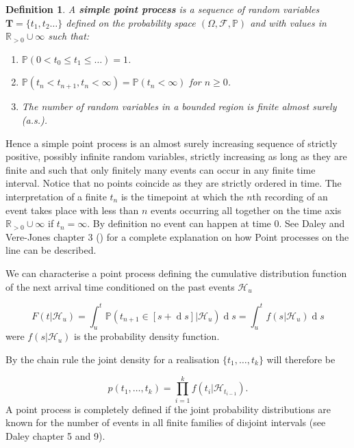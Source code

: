 \documentclass[11pt,a4paper]{article}
\renewcommand{\d}[1]{\ensuremath{\operatorname{d}\!{#1}}}
\renewcommand{\vec}[1]{\mathbf{#1}}
\newtheorem{definition}{Definition}[section]
\begin{document}
\begin{definition}
    A \textbf{simple point process} is a sequence of random variables $\vec{T} = \{ t_1, t_2 \dots \}$ defined on the probability space $(\Omega, \mathcal{F}, \mathbb{P})$ and with values in $\mathbb{R}_{>0} \cup \infty$ such that:
    \begin{enumerate}[label=(\roman*)]
        \item $\mathbb{P}(0 < t_0 \leq t_1 \leq \dots) = 1$.
        \item $\mathbb{P}(t_n < t_{n+1}, t_n < \infty) = \mathbb{P}(t_n < \infty)$ for $n \geq 0$.
        \item The number of random variables in a bounded region is finite almost surely (a.s.).
    \end{enumerate}
\end{definition}

Hence a simple point process is an almost surely increasing sequence of strictly positive, possibly infinite random variables, strictly increasing as long as they are finite and such that only finitely many events can occur in any finite time interval. Notice that no points coincide as they are strictly ordered in time.
The interpretation of a finite $t_n$ is the timepoint at which the $n$th recording of an event takes place with less than $n$ events occurring all together on the time axis $\mathbb{R}_{>0} \cup \infty$ if $t_n = \infty$. By definition no event can happen at time $0$. See Daley and Vere-Jones chapter 3 (\cite{Daley}) for a complete explanation on how Point processes on the line can be described.

We can characterise a point process defining the cumulative distribution function of the next arrival time conditioned on the past events $\mathcal{H}_u$

\begin{equation} \label{eq:CumDistPointProc}
    F(t|\mathcal{H}_u) = \int_u^t \mathbb{P}(t_{n+1} \in [s+\d s] | \mathcal{H}_u) \d s = \int_u^t f(s | \mathcal{H}_u) \d s
\end{equation}
were $f(s | \mathcal{H}_u)$ is the probability density function.

By the chain rule the joint density for a realisation $\{ t_1, \dots, t_k\}$ will therefore be

\begin{equation}\label{eq:JointDensHawkes}
    p(t_1, \dots, t_k) = \prod_{i=1}^k f(t_i | \mathcal{H}_{t_{i-1}}).
\end{equation}
A point process is completely defined if the joint probability distributions are known for the number of events in all finite families of disjoint intervals (see  Daley \cite{Daley} chapter 5 and 9).
\end{document}
